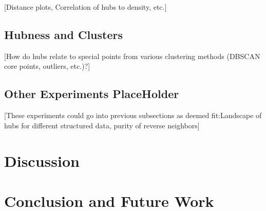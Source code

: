 \documentclass[graybox]{svmult}
\begin{document}
[Distance plots, Correlation of hubs to density, etc.]

\subsection{Hubness and Clusters}
\label{sec:4.2}
        
[How do hubs relate to special points from various clustering methods (DBSCAN core points, outliers, etc.)?]

\subsection{Other Experiments PlaceHolder}
[These experiments could go into previous subsections as deemed fit:Landscape of hubs for different structured data, purity of reverse neighbors]

\section{Discussion}
\label{sec:5}



\section{Conclusion and Future Work}
\label{sec:6}

%
\end{document}
